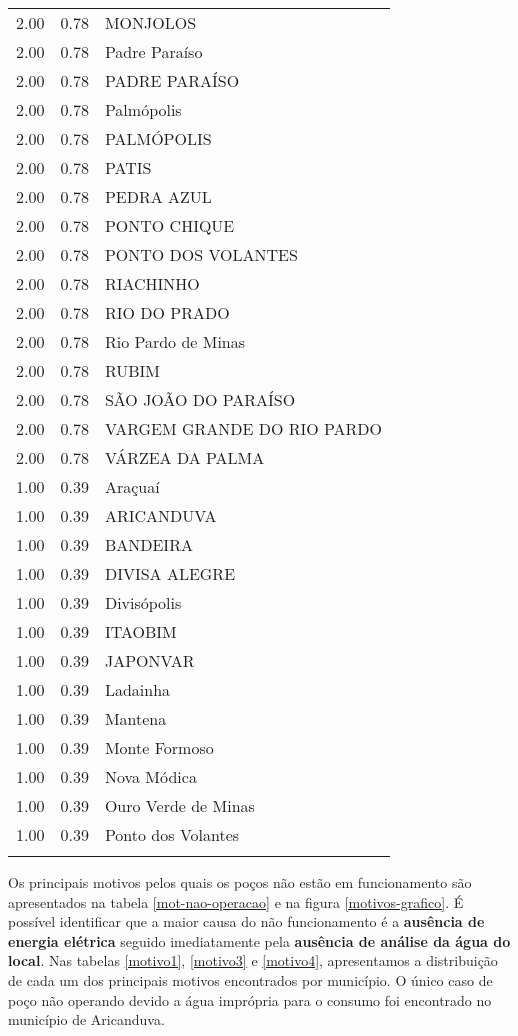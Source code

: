 \documentclass[a4paper, 12pt, openright, oneside, english, brazil, article]{abntex2}
\begin{document}
\begin{scriptsize}
\begin{longtable}{rrl}
		2.00 & 0.78 & MONJOLOS \\ 
		2.00 & 0.78 & Padre Paraíso \\ 
		2.00 & 0.78 & PADRE PARAÍSO \\ 
		2.00 & 0.78 & Palmópolis \\ 
		2.00 & 0.78 & PALMÓPOLIS \\ 
		2.00 & 0.78 & PATIS \\ 
		2.00 & 0.78 & PEDRA AZUL \\ 
		2.00 & 0.78 & PONTO CHIQUE \\ 
		2.00 & 0.78 & PONTO DOS VOLANTES \\ 
		2.00 & 0.78 & RIACHINHO \\ 
		2.00 & 0.78 & RIO DO PRADO \\ 
		2.00 & 0.78 & Rio Pardo de Minas \\ 
		2.00 & 0.78 & RUBIM \\ 
		2.00 & 0.78 & SÃO JOÃO DO PARAÍSO \\ 
		2.00 & 0.78 & VARGEM GRANDE DO RIO PARDO \\ 
		2.00 & 0.78 & VÁRZEA DA PALMA \\ 
		1.00 & 0.39 & Araçuaí \\ 
		1.00 & 0.39 & ARICANDUVA \\ 
		1.00 & 0.39 & BANDEIRA \\ 
		1.00 & 0.39 & DIVISA ALEGRE \\ 
		1.00 & 0.39 & Divisópolis \\ 
		1.00 & 0.39 & ITAOBIM \\ 
		1.00 & 0.39 & JAPONVAR \\ 
		1.00 & 0.39 & Ladainha \\ 
		1.00 & 0.39 & Mantena \\ 
		1.00 & 0.39 & Monte Formoso \\ 
		1.00 & 0.39 & Nova Módica \\ 
		1.00 & 0.39 & Ouro Verde de Minas \\ 
		1.00 & 0.39 & Ponto dos Volantes \\ 
		\hline
		\hline
		\label{poc-operacao}
	\end{longtable}
	\end{scriptsize}
	
	Os principais motivos pelos quais os poços não estão em funcionamento são apresentados na tabela \ref{mot-nao-operacao} e na figura \ref{motivos-grafico}. É possível identificar que a maior causa do não funcionamento é a \textbf{ausência de energia elétrica} seguido imediatamente pela \textbf{ausência de análise da água do local}. Nas tabelas \ref{motivo1}, \ref{motivo3} e \ref{motivo4}, apresentamos a distribuição de cada um dos principais motivos encontrados por município. O único caso de poço não operando devido a água imprópria para o consumo foi encontrado no município de Aricanduva.
	
\end{document}
